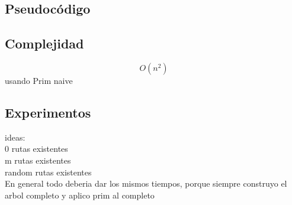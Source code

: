 \subsection{Pseudocódigo}


\subsection{Complejidad}

$$O(n^2)$$ usando Prim naive


\subsection{Experimentos}

ideas:\\
0 rutas existentes\\
m rutas existentes\\
random rutas existentes\\

En general todo deberia dar los mismos tiempos, porque siempre construyo el arbol completo y aplico prim al completo